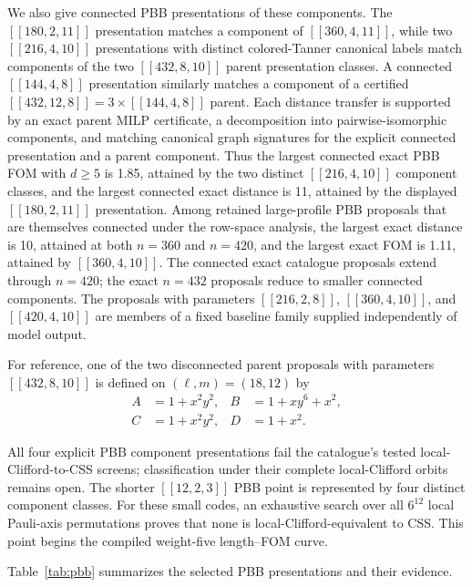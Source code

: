 \documentclass[aps,prx,twocolumn,superscriptaddress,nofootinbib,floatfix]{revtex4-2}
\newcommand{\code}[1]{\ensuremath{\left[\!\left[#1\right]\!\right]}}
\begin{document}
We also give connected PBB presentations of these components.
The $\code{180,2,11}$ presentation matches a component of
$\code{360,4,11}$, while two $\code{216,4,10}$ presentations with distinct
colored-Tanner canonical labels match components of the two $\code{432,8,10}$
parent presentation classes.  A connected
$\code{144,4,8}$ presentation similarly matches a component of a certified
$\code{432,12,8}=3\times\code{144,4,8}$ parent.  Each distance transfer is
supported by an exact parent MILP certificate, a decomposition into
pairwise-isomorphic components, and matching canonical graph signatures for
the explicit connected presentation and a parent component.  Thus the largest
connected exact PBB FOM with $d\geq5$ is 1.85, attained by the two distinct
$\code{216,4,10}$ component classes, and the largest connected exact distance
is 11, attained by the displayed $\code{180,2,11}$ presentation.  Among
retained large-profile PBB proposals that are
themselves connected under the row-space analysis, the largest exact distance is
10, attained at both $n=360$ and $n=420$, and the largest exact FOM is 1.11,
attained by $\code{360,4,10}$.  The connected exact catalogue proposals
extend through $n=420$; the exact $n=432$ proposals reduce to smaller
connected components.  The proposals with parameters $\code{216,2,8}$,
$\code{360,4,10}$, and $\code{420,4,10}$ are members of a fixed baseline family
supplied independently of model output.

For reference, one of the two disconnected parent proposals with
parameters $\code{432,8,10}$ is defined on $(\ell,m)=(18,12)$ by
\begin{align}
A&=1+x^2y^2, & B&=1+xy^6+x^2,\nonumber\\
C&=1+x^2y^2, & D&=1+x^2.
\end{align}

All four explicit PBB component presentations fail the catalogue's tested
local-Clifford-to-CSS screens; classification under their complete
local-Clifford orbits remains open.  The shorter $\code{12,2,3}$ PBB point is
represented by four distinct component classes.  For these small codes, an
exhaustive search over all $6^{12}$ local Pauli-axis permutations proves that
none is local-Clifford-equivalent to CSS.  This point begins the compiled
weight-five length--FOM curve.

Table~\ref{tab:pbb} summarizes the selected PBB presentations and their evidence.
\end{document}
